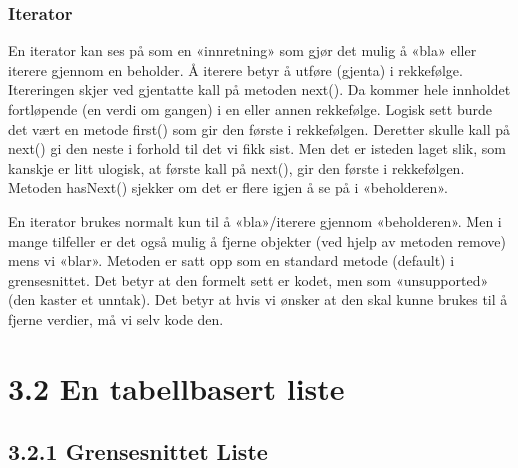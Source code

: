 \documentclass[11pt]{article}
\begin{document}
        \subsubsection{Iterator}
            \begin{multicols}{2}
                En iterator kan ses på som en «innretning» som gjør det mulig å «bla» eller iterere
                gjennom en beholder. Å iterere betyr å utføre (gjenta) i rekkefølge. Itereringen skjer ved
                gjentatte kall på metoden next(). Da kommer hele innholdet fortløpende (en verdi om
                gangen) i en eller annen rekkefølge. Logisk sett burde det vært en metode first() som gir
                den første i rekkefølgen. Deretter skulle kall på next() gi den neste i forhold til det vi fikk
                sist. Men det er isteden laget slik, som kanskje er litt ulogisk, at første kall på next(), gir den
                første i rekkefølgen. Metoden hasNext() sjekker om det er flere igjen å se på i «beholderen».
    
                \columnbreak

                En iterator brukes normalt kun til å «bla»/iterere gjennom «beholderen». Men i mange
                tilfeller er det også mulig å fjerne objekter (ved hjelp av metoden remove) mens vi «blar».
                Metoden er satt opp som en standard metode (default) i grensesnittet. Det betyr at den
                formelt sett er kodet, men som «unsupported» (den kaster et unntak). Det betyr at hvis vi
                ønsker at den skal kunne brukes til å fjerne verdier, må vi selv kode den.
            \end{multicols}



\section{3.2 En tabellbasert liste}
    \subsection{3.2.1 Grensesnittet Liste}
\end{document}

